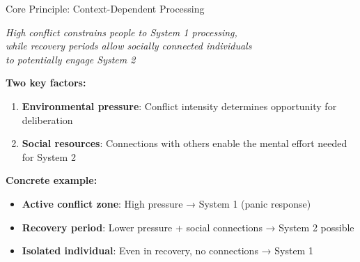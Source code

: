 \documentclass[aspectratio=169]{beamer}
\begin{document}
\begin{frame}{Core Principle: Context-Dependent Processing}

\begin{center}
\Large
\textit{High conflict constrains people to System 1 processing,\\
while recovery periods allow socially connected individuals\\
to potentially engage System 2}
\end{center}

\vspace{1em}

\textbf{Two key factors:}

\begin{enumerate}
    \item \textbf{Environmental pressure}: Conflict intensity determines opportunity for deliberation
    \item \textbf{Social resources}: Connections with others enable the mental effort needed for System 2
\end{enumerate}

\vspace{1em}

\textbf{Concrete example:}
\begin{itemize}
    \item \textbf{Active conflict zone}: High pressure → System 1 (panic response)
    \item \textbf{Recovery period}: Lower pressure + social connections → System 2 possible
    \item \textbf{Isolated individual}: Even in recovery, no connections → System 1
\end{itemize}

\end{frame}
\end{document}
